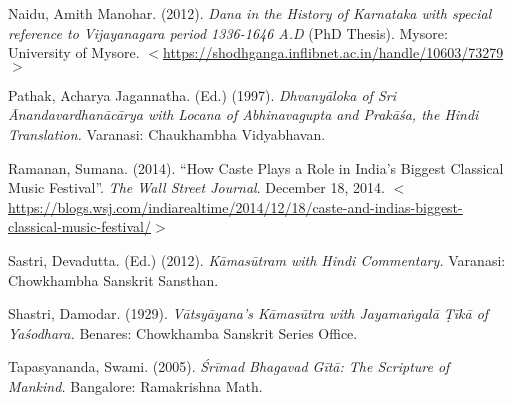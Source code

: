 \begin{thebibliography}{99}
  Naidu, Amith Manohar. (2012). \textit{Dana in the History of Karnataka with special reference to Vijayanagara period 1336-1646 A.D} (PhD Thesis). Mysore: University of Mysore. $<$\url{https://shodhganga.inflibnet.ac.in/handle/10603/73279}$>$

  Pathak, Acharya Jagannatha. (Ed.) (1997). \textit{Dhvanyāloka of Sri Ānandavardhanācārya with Locana of Abhinavagupta and Prakāśa, the Hindi Translation.} Varanasi: Chaukhambha Vidyabhavan.

  Ramanan, Sumana. (2014). “How Caste Plays a Role in India’s Biggest Classical Music Festival”. \textit{The Wall Street Journal}. December 18, 2014. $<$\url{https://blogs.wsj.com/indiarealtime/2014/12/18/caste-and-indias-biggest-classical-music-festival/}$>$

  Sastri, Devadutta. (Ed.) (2012). \textit{Kāmasūtram with Hindi Commentary.} Varanasi: Chowkhambha Sanskrit Sansthan.

  Shastri, Damodar. (1929). \textit{Vātsyāyana’s Kāmasūtra with Jayamaṅgalā Ṭīkā of Yaśodhara.} Benares: Chowkhamba Sanskrit Series Office.

  Tapasyananda, Swami. (2005). \textit{Śrīmad Bhagavad Gītā: The Scripture of Mankind.} Bangalore: Ramakrishna Math.

 \end{thebibliography}

\theendnotes

